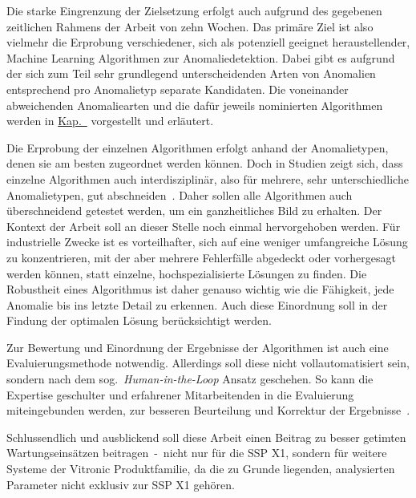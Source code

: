 Die starke Eingrenzung der Zielsetzung erfolgt auch aufgrund des gegebenen zeitlichen Rahmens der Arbeit von zehn Wochen. Das primäre
Ziel ist also vielmehr die Erprobung verschiedener, sich als potenziell geeignet heraustellender, Machine Learning Algorithmen zur
Anomaliedetektion. Dabei gibt es aufgrund der sich zum Teil sehr grundlegend unterscheidenden Arten von Anomalien entsprechend pro
Anomalietyp separate Kandidaten. Die voneinander abweichenden Anomaliearten und die dafür jeweils nominierten Algorithmen werden in
\hyperref[ch:anomalien]{Kap.~} vorgestellt und erläutert.

Die Erprobung der einzelnen Algorithmen erfolgt anhand der Anomalietypen, denen sie am besten zugeordnet werden können. Doch in
Studien zeigt sich, dass einzelne Algorithmen auch interdisziplinär, also für mehrere, sehr unterschiedliche Anomalietypen, gut
abschneiden~\cite[S.~30~-~31]{Wenig2024}\cite{Schmidl2022}. Daher sollen alle Algorithmen auch überschneidend getestet werden, um ein ganzheitliches Bild zu erhalten.
Der Kontext der Arbeit soll an dieser Stelle noch einmal hervorgehoben werden. Für industrielle Zwecke ist es vorteilhafter, sich auf eine
weniger umfangreiche Lösung zu konzentrieren, mit der aber mehrere Fehlerfälle abgedeckt oder vorhergesagt werden können, statt einzelne,
hochspezialisierte Lösungen zu finden. Die Robustheit eines Algorithmus ist daher genauso wichtig wie die Fähigkeit, jede Anomalie bis
ins letzte Detail zu erkennen. Auch diese Einordnung soll in der Findung der optimalen Lösung berücksichtigt werden.

Zur Bewertung und Einordnung der Ergebnisse der Algorithmen ist auch eine Evaluierungsmethode notwendig. Allerdings soll diese nicht
vollautomatisiert sein, sondern nach dem sog.~\textit{Human-in-the-Loop} Ansatz geschehen. So kann die Expertise geschulter und
erfahrener Mitarbeitenden in die Evaluierung miteingebunden werden, zur besseren Beurteilung und Korrektur der Ergebnisse~\cite{Deng2024}.

Schlussendlich und ausblickend soll diese Arbeit einen Beitrag zu besser getimten Wartungseinsätzen beitragen~-~nicht nur für die SSP X1,
sondern für weitere Systeme der Vitronic Produktfamilie, da die zu Grunde liegenden, analysierten Parameter nicht exklusiv zur SSP X1 gehören.